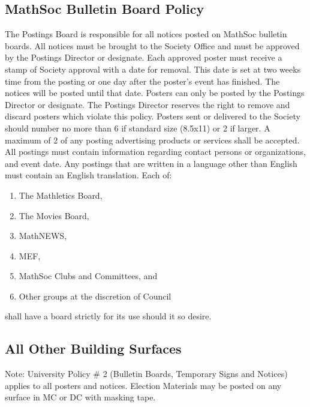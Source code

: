 \subsection{MathSoc Bulletin Board Policy}
The Postings Board is responsible for all notices posted on MathSoc bulletin boards.
All notices must be brought to the Society Office and must be approved by the Postings Director or designate.
Each approved poster must receive a stamp of Society approval with a date for removal. This date is set at two weeks time from the posting or one day after the poster's event has finished. The notices will be posted until that date.
Posters can only be posted by the Postings Director or designate. The Postings Director reserves the right to remove and discard posters which violate this policy.
Posters sent or delivered to the Society should number no more than 6 if standard size (8.5x11) or 2 if larger. A maximum of 2 of any posting advertising products or services shall be accepted.
All postings must contain information regarding contact persons or organizations, and event date.
Any postings that are written in a language other than English must contain an English translation.
Each of:
\begin{enumerate}
\item The Mathletics Board,
\item The Movies Board,
\item MathNEWS,
\item MEF,
\item MathSoc Clubs and Committees, and
\item Other groups at the discretion of Council
\end{enumerate}
shall have a board strictly for its use should it so desire.

\subsection{All Other Building Surfaces}
Note: University Policy \# 2 (Bulletin Boards, Temporary Signs and Notices) applies to all posters and notices. Election Materials may be posted on any surface in MC or DC with masking tape.

